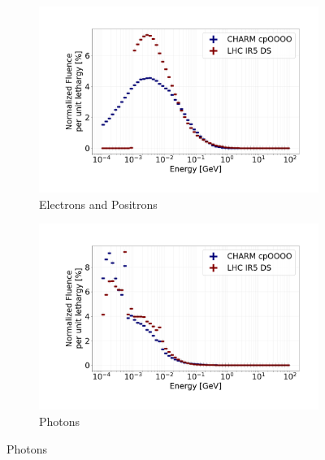 \documentclass[encoding=utf8,british]{tumphthesis}
\begin{document}
\begin{figure}
\begin{subfigure}{0.49\textwidth}
  \includegraphics[width=\linewidth]{figures/electron_positron_y_linear.png}
  \caption{Electrons and Positrons}
  \label{fig:BLM-spectrum-electrons-positrons}
\end{subfigure}%
\begin{subfigure}{0.49\textwidth}
  \includegraphics[width=\linewidth]{figures/photon_y_linear.png}
  \caption{Photons}
  \label{fig:BLM-spectrum-photons}
\end{subfigure}

\medskip


\end{figure}
\end{document}
